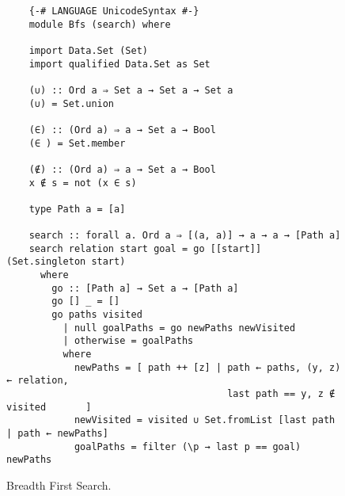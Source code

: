 \begin{figure}[!ht]
\centering
\begin{verbatim}
    {-# LANGUAGE UnicodeSyntax #-}
    module Bfs (search) where
    
    import Data.Set (Set)
    import qualified Data.Set as Set
    
    (∪) :: Ord a ⇒ Set a → Set a → Set a
    (∪) = Set.union
    
    (∈) :: (Ord a) ⇒ a → Set a → Bool
    (∈ ) = Set.member
    
    (∉) :: (Ord a) ⇒ a → Set a → Bool
    x ∉ s = not (x ∈ s)
    
    type Path a = [a]
    
    search :: forall a. Ord a ⇒ [(a, a)] → a → a → [Path a]
    search relation start goal = go [[start]] (Set.singleton start)
      where
        go :: [Path a] → Set a → [Path a]
        go [] _ = []
        go paths visited
          | null goalPaths = go newPaths newVisited
          | otherwise = goalPaths
          where
            newPaths = [ path ++ [z] | path ← paths, (y, z) ← relation, 
                                       last path == y, z ∉ visited       ]
            newVisited = visited ∪ Set.fromList [last path | path ← newPaths]
            goalPaths = filter (\p → last p == goal) newPaths
\end{verbatim}
\vspace*{-0.3cm}
\caption{Breadth First Search.}
\label{fig:Bfs.hs}
\end{figure}
\noindent


